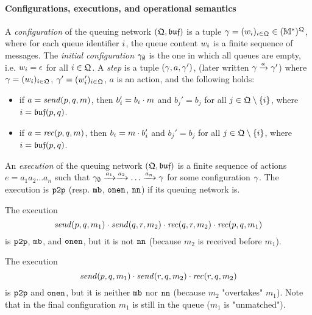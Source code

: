 \paragraph{\bf Configurations, executions, and operational semantics}
A \emph{configuration} of the queuing network $(\mathfrak{Q},\mathfrak{buf})$ is
a tuple $\gamma=(w_{i})_{i\in\mathfrak{Q}}\in (\mathbb{M}^*)^{\mathfrak{Q}}$,
where for each queue identifier $i$, the queue content $w_{i}$ is a finite sequence of messages.
The \emph{initial configuration} $\gamma_{\emptyset}$ is the one in which all queues are empty, i.e.
$w_{i}=\epsilon$ for all $i\in\mathfrak{Q}$.
A \emph{step} is a tuple $(\gamma,a,\gamma')$, (later written $\gamma\xrightarrow{a}\gamma'$)
where $\gamma=(w_{i})_{i\in\mathfrak{Q}}$,
$\gamma'=(w_{i}')_{i\in\mathfrak{Q}}$,
$a$ is an action, and the following holds:
\begin{itemize}
  \item if $a=\mathit{send}(p, q, m)$, then $b'_{i}=b_{i}\cdot m$
  and $b_j'=b_j$ for all $j\in \mathfrak{Q}\setminus\{i\}$,
  where $i=\mathfrak{buf}(p,q)$.
  \item if $a=\mathit{rec}(p, q, m)$, then $b_{i}=m\cdot b'_{i}$
  and $b_j'=b_j$ for all $j\in \mathfrak{Q}\setminus\{i\}$,
  where $i=\mathfrak{buf}(p,q)$.
\end{itemize}
An \emph{execution} of the queuing network $(\mathfrak{Q},\mathfrak{buf})$
is a finite sequence of actions $e=a_1a_2\ldots a_n$ such that
$\gamma_{\emptyset}\xrightarrow{a_1}\xrightarrow{a_2}\ldots\xrightarrow{a_n}\gamma$ for some configuration $\gamma$.
The execution is $\mathtt{p2p}$ (resp. $\mathtt{mb}$, $\mathtt{onen}$, $\mathtt{nn}$) if its queuing network is.

\begin{example}
The execution
$$
\mathit{send}(p, q, m_1)\cdot\mathit{send}(q, r, m_2)\cdot\mathit{rec}(q, r, m_2)\cdot\mathit{rec}(p, q, m_1)
$$
is $\mathtt{p2p}$, $\mathtt{mb}$, and $\mathtt{onen}$, but it is not $\mathtt{nn}$ (because $m_2$ is received before $m_1$).
\end{example}

\begin{example}
    The execution
    $$
    \mathit{send}(p, q, m_1)\cdot\mathit{send}(r, q, m_2)\cdot\mathit{rec}(r, q, m_2)
    $$
    is $\mathtt{p2p}$ and $\mathtt{onen}$, but it is neither $\mathtt{mb}$ nor $\mathtt{nn}$ (because $m_2$ "overtakes" $m_1$). Note that in the
    final configuration $m_1$ is still in the queue ($m_1$ is "unmatched").
\end{example}


